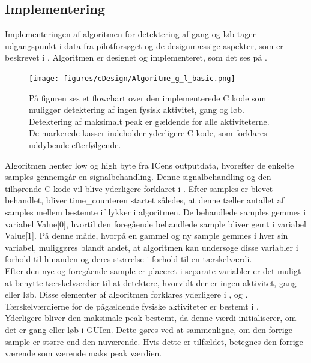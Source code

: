 \subsection{Implementering}
Implementeringen af algoritmen for detektering af gang og løb tager udgangspunkt i data fra pilotforsøget og de designmæssige aspekter, som er beskrevet i . Algoritmen er designet og implementeret, som det ses på .
\begin{figure}[H]
	\centering
	\texttt{[image: figures/cDesign/Algoritme\_g\_l\_basic.png]}
	\caption{På figuren ses et flowchart over den implementerede C kode som muliggør detektering af ingen fysisk aktivitet, gang og løb. Detektering af maksimalt peak er gældende for alle aktiviteterne. \\
De markerede kasser indeholder yderligere C kode, som forklares uddybende efterfølgende.}
	\label{fig:basic_algo_g_l}
\end{figure} \vspace{-0.5cm}
Algoritmen henter low og high byte fra ICens outputdata, hvorefter de enkelte samples gennemgår en signalbehandling. Denne signalbehandling og den tilhørende C kode vil blive yderligere forklaret i . Efter samples er blevet behandlet, bliver time\_counteren startet således, at denne tæller antallet af samples mellem bestemte if lykker i algoritmen. De behandlede samples gemmes i variabel Value[0], hvortil den foregående behandlede sample bliver gemt i variabel Value[1]. På denne måde, hvorpå en gammel og ny sample gemmes i hver sin variabel, muliggøres blandt andet, at algoritmen kan undersøge disse variabler i forhold til hinanden og deres størrelse i forhold til en tærskelværdi. \\
Efter den nye og foregående sample er placeret i separate variabler er det muligt at benytte tærskelværdier til at detektere, hvorvidt der er ingen aktivitet, gang eller løb. Disse elementer af algoritmen forklares yderligere i ,  og . Tærskelværdierne for de pågældende fysiske aktiviteter er bestemt i . \\ 
Yderligere bliver den maksimale peak bestemt, da denne værdi initialiserer, om det er gang eller løb i GUIen. Dette gøres ved at sammenligne, om den forrige sample er større end den nuværende. Hvis dette er tilfældet, betegnes den forrige værende som værende maks peak værdien. %

